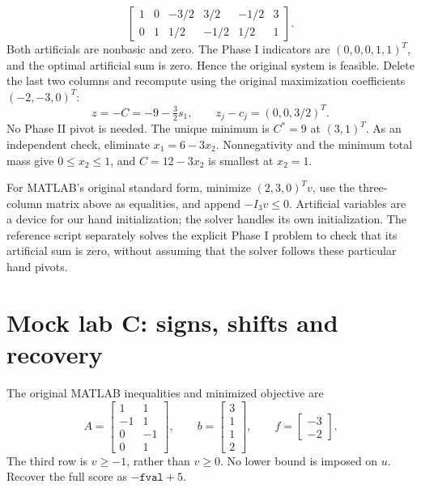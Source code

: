 \documentclass[11pt,a4paper]{article}
\begin{document}
\[
  \left[\begin{array}{rrrrr|r}
      1&0&-3/2&3/2&-1/2&3\\0&1&1/2&-1/2&1/2&1
    \end{array}\right].
\]
Both artificials are nonbasic and zero. The Phase I indicators are
$(0,0,0,1,1)^T$, and the optimal artificial sum is zero. Hence the
original system is feasible. Delete the last two columns and recompute using
the original maximization coefficients $(-2,-3,0)^T$:
\[
  z=-C=-9-\tfrac32s_1,\qquad z_j-c_j=(0,0,3/2)^T.
\]
No Phase II pivot is needed. The unique minimum is $C^*=9$ at $(3,1)^T$.
As an independent check, eliminate $x_1=6-3x_2$. Nonnegativity and the
minimum total mass give $0\leq x_2\leq1$, and
$C=12-3x_2$ is smallest at $x_2=1$.

For MATLAB's original standard form, minimize $(2,3,0)^Tv$, use the
three-column matrix above as equalities, and append $-I_3v\leq0$.
Artificial variables are a device for our hand initialization; the solver
handles its own initialization. The reference script separately solves the
explicit Phase I problem to check that its artificial sum is zero, without
assuming that the solver follows these particular hand pivots.

\clearpage
\section{Mock lab C: signs, shifts and recovery}
The original MATLAB inequalities and minimized objective are
\[
  A=\begin{bmatrix}1&1\\-1&1\\0&-1\\0&1\end{bmatrix},\qquad
  b=\begin{bmatrix}3\\1\\1\\2\end{bmatrix},\qquad
  f=\begin{bmatrix}-3\\-2\end{bmatrix}.
\]
The third row is $v\geq-1$, rather than $v\geq0$. No lower bound is imposed
on $u$. Recover the full score as $-\texttt{fval}+5$.
\end{document}
